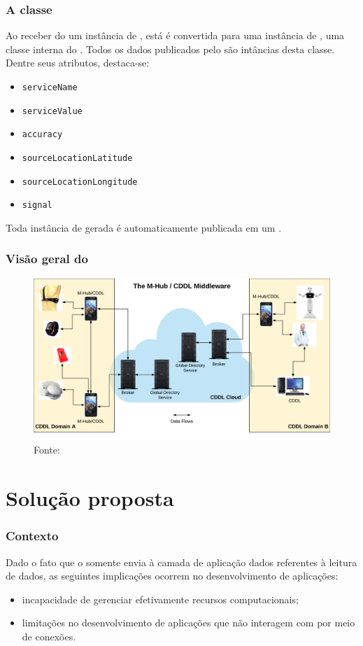\documentclass[aspectratio=169]{beamer}
\begin{document}
\begin{frame}
	\frametitle{A classe \msg}
	Ao receber do \mhub um instância de \sensordata, está é convertida para uma instância de \msg, uma classe interna do \cddl.
	Todos os dados publicados pelo \cddl são intâncias desta classe. Dentre seus atributos, destaca-se:
	\begin{itemize}
		\item \texttt{serviceName}

		\item \texttt{serviceValue}

		\item \texttt{accuracy}

		\item \texttt{sourceLocationLatitude}

		\item \texttt{sourceLocationLongitude}

		\item \texttt{signal}
	\end{itemize}
	Toda instância de \msg gerada é automaticamente publicada em um \broker.
\end{frame}

\begin{frame}
	\frametitle{Visão geral do \mhubcddl}
	\begin{figure}
		\centering
		\includegraphics[width=0.70\linewidth]{img/general-vision-cddl.png}
		\caption{Fonte: \cite{gomes:2017}}
	\end{figure}
\end{frame}


\section{Solução proposta}


\begin{frame}
	\frametitle{Contexto}
	Dado o fato que o \cddl somente envia à camada de aplicação dados referentes à leitura de dados, as seguintes implicações ocorrem no desenvolvimento de aplicações:
	\begin{itemize}
		\item incapacidade de gerenciar efetivamente recursos computacionais;

		\item limitações no desenvolvimento de aplicações que não interagem com \smartobjs por meio de conexões.
	\end{itemize}
\end{frame}
\end{document}
